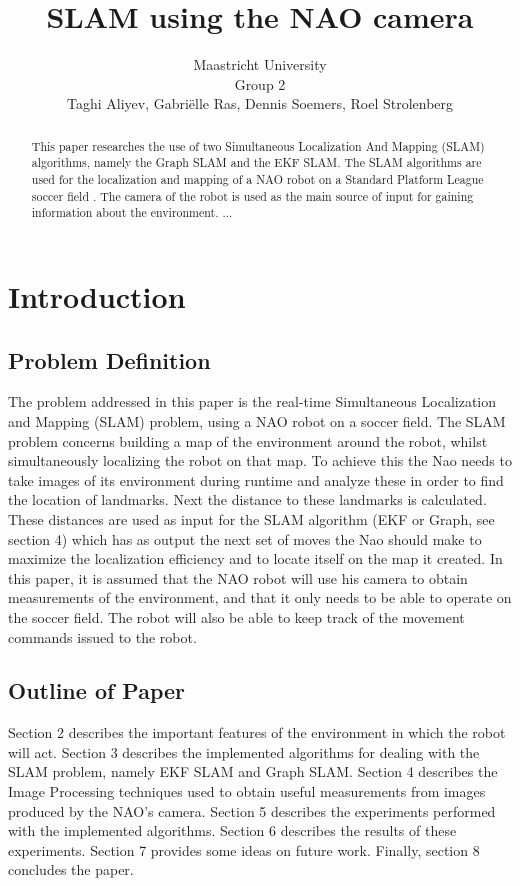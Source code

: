 \documentclass{ba-kecs}
\title{SLAM using the NAO camera}
\author{Maastricht University \\ Group 2 \\ Taghi Aliyev, Gabri\"elle Ras, Dennis Soemers, Roel Strolenberg}
\numberwithin{figure}{section}
\numberwithin{equation}{section}
\begin{document}
\maketitle


\begin{abstract}

This paper researches the use of two Simultaneous Localization And Mapping (SLAM) algorithms, namely the Graph SLAM and the EKF SLAM. The SLAM algorithms are used for the localization and mapping of a NAO robot on a Standard Platform League soccer field \cite{cd1}. The camera of the robot is used as the main source of input for gaining information about the environment.
...

\end{abstract}


\section{Introduction}


\subsection{Problem Definition}
The problem addressed in this paper is the real-time Simultaneous Localization and Mapping (SLAM) problem, using a NAO robot on a soccer field. The SLAM problem concerns building a map of the environment around the robot, whilst simultaneously localizing the robot on that map. To achieve this the Nao needs to take images of its environment during runtime and analyze these in order to find the location of landmarks. Next the distance to these landmarks is calculated. These distances are used as input for the SLAM algorithm (EKF or Graph, see section 4) which has as output the next set of moves the Nao should make to maximize the localization efficiency and to locate itself on the map it created.
	In this paper, it is assumed that the NAO robot will use his camera to obtain measurements of the environment, and that it only needs to be able to operate on the soccer field. The robot will also be able to keep track of the movement commands issued to the robot.

\subsection{Outline of Paper}
Section 2 describes the important features of the environment in which the robot will act. Section 3 describes the implemented algorithms for dealing with the SLAM problem, namely EKF SLAM and Graph SLAM. Section 4 describes the Image Processing techniques used to obtain useful measurements from images produced by the NAO's camera. Section 5 describes the experiments performed with the implemented algorithms. Section 6 describes the results of these experiments. Section 7 provides some ideas on future work. Finally, section 8 concludes the paper.
\end{document}
